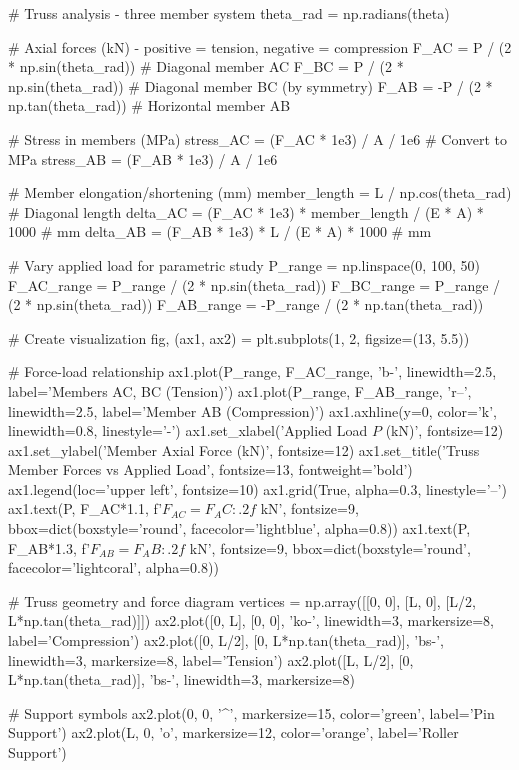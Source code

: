 \documentclass[11pt,a4paper]{article}
\begin{document}
\begin{pycode}
# Truss analysis - three member system
theta_rad = np.radians(theta)

# Axial forces (kN) - positive = tension, negative = compression
F_AC = P / (2 * np.sin(theta_rad))  # Diagonal member AC
F_BC = P / (2 * np.sin(theta_rad))  # Diagonal member BC (by symmetry)
F_AB = -P / (2 * np.tan(theta_rad))  # Horizontal member AB

# Stress in members (MPa)
stress_AC = (F_AC * 1e3) / A / 1e6  # Convert to MPa
stress_AB = (F_AB * 1e3) / A / 1e6

# Member elongation/shortening (mm)
member_length = L / np.cos(theta_rad)  # Diagonal length
delta_AC = (F_AC * 1e3) * member_length / (E * A) * 1000  # mm
delta_AB = (F_AB * 1e3) * L / (E * A) * 1000  # mm

# Vary applied load for parametric study
P_range = np.linspace(0, 100, 50)
F_AC_range = P_range / (2 * np.sin(theta_rad))
F_BC_range = P_range / (2 * np.sin(theta_rad))
F_AB_range = -P_range / (2 * np.tan(theta_rad))

# Create visualization
fig, (ax1, ax2) = plt.subplots(1, 2, figsize=(13, 5.5))

# Force-load relationship
ax1.plot(P_range, F_AC_range, 'b-', linewidth=2.5, label='Members AC, BC (Tension)')
ax1.plot(P_range, F_AB_range, 'r--', linewidth=2.5, label='Member AB (Compression)')
ax1.axhline(y=0, color='k', linewidth=0.8, linestyle='-')
ax1.set_xlabel('Applied Load $P$ (kN)', fontsize=12)
ax1.set_ylabel('Member Axial Force (kN)', fontsize=12)
ax1.set_title('Truss Member Forces vs Applied Load', fontsize=13, fontweight='bold')
ax1.legend(loc='upper left', fontsize=10)
ax1.grid(True, alpha=0.3, linestyle='--')
ax1.text(P, F_AC*1.1, f'$F_{{AC}} = {F_AC:.2f}$ kN', fontsize=9,
         bbox=dict(boxstyle='round', facecolor='lightblue', alpha=0.8))
ax1.text(P, F_AB*1.3, f'$F_{{AB}} = {F_AB:.2f}$ kN', fontsize=9,
         bbox=dict(boxstyle='round', facecolor='lightcoral', alpha=0.8))

# Truss geometry and force diagram
vertices = np.array([[0, 0], [L, 0], [L/2, L*np.tan(theta_rad)]])
ax2.plot([0, L], [0, 0], 'ko-', linewidth=3, markersize=8, label='Compression')
ax2.plot([0, L/2], [0, L*np.tan(theta_rad)], 'bs-', linewidth=3, markersize=8, label='Tension')
ax2.plot([L, L/2], [0, L*np.tan(theta_rad)], 'bs-', linewidth=3, markersize=8)

# Support symbols
ax2.plot(0, 0, '^', markersize=15, color='green', label='Pin Support')
ax2.plot(L, 0, 'o', markersize=12, color='orange', label='Roller Support')


\end{pycode}
\end{document}
